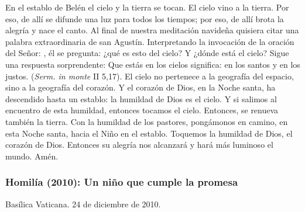 \begin{body}
\begin{body}
En el establo de Belén el cielo y la tierra se tocan. El cielo vino a la tierra. Por eso, de allí se difunde una luz para todos los tiempos; por eso, de allí brota la alegría y nace el canto. Al final de nuestra meditación navideña quisiera citar una palabra extraordinaria de san Agustín. Interpretando la invocación de la oración del Señor: , él se pregunta: ¿qué es esto del cielo? Y ¿dónde está el cielo? Sigue una respuesta sorprendente: Que estás en los cielos significa: en los santos y en los justos.  (\emph{Serm. in monte} II 5,17). El cielo no pertenece a la geografía del espacio, sino a la geografía del corazón. Y el corazón de Dios, en la Noche santa, ha descendido hasta un establo: la humildad de Dios es el cielo. Y si salimos al encuentro de esta humildad, entonces tocamos el cielo. Entonces, se renueva también la tierra. Con la humildad de los pastores, pongámonos en camino, en esta Noche santa, hacia el Niño en el establo. Toquemos la humildad de Dios, el corazón de Dios. Entonces su alegría nos alcanzará y hará más luminoso el mundo. Amén.

\subsubsection{Homilía (2010): Un niño que cumple la promesa}

Basílica Vaticana. 24 de diciembre de 2010.


\end{body}
\end{body}
